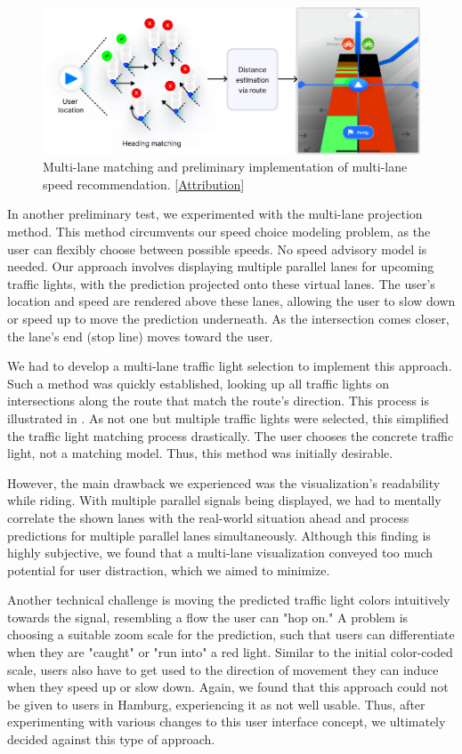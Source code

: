 \begin{figure}[t]
\centering
\includegraphics[width=\linewidth]{images/multi-lane-view.pdf}
\caption{Multi-lane matching and preliminary implementation of multi-lane speed recommendation. [\hyperref[attribution]{Attribution}]}
\label{fig:multi-lane-view}
\end{figure}

In another preliminary test, we experimented with the multi-lane projection method. This method circumvents our speed choice modeling problem, as the user can flexibly choose between possible speeds. No speed advisory model is needed. Our approach involves displaying multiple parallel lanes for upcoming traffic lights, with the prediction projected onto these virtual lanes. The user's location and speed are rendered above these lanes, allowing the user to slow down or speed up to move the prediction underneath. As the intersection comes closer, the lane's end (stop line) moves toward the user. 

We had to develop a multi-lane traffic light selection to implement this approach. Such a method was quickly established, looking up all traffic lights on intersections along the route that match the route's direction. This process is illustrated in . As not one but multiple traffic lights were selected, this simplified the traffic light matching process drastically. The user chooses the concrete traffic light, not a matching model. Thus, this method was initially desirable.

However, the main drawback we experienced was the visualization's readability while riding. With multiple parallel signals being displayed, we had to mentally correlate the shown lanes with the real-world situation ahead and process predictions for multiple parallel lanes simultaneously. Although this finding is highly subjective, we found that a multi-lane visualization conveyed too much potential for user distraction, which we aimed to minimize.

Another technical challenge is moving the predicted traffic light colors intuitively towards the signal, resembling a flow the user can "hop on." A problem is choosing a suitable zoom scale for the prediction, such that users can differentiate when they are "caught" or "run into" a red light. Similar to the initial color-coded scale, users also have to get used to the direction of movement they can induce when they speed up or slow down. Again, we found that this approach could not be given to users in Hamburg, experiencing it as not well usable. Thus, after experimenting with various changes to this user interface concept, we ultimately decided against this type of approach. 

